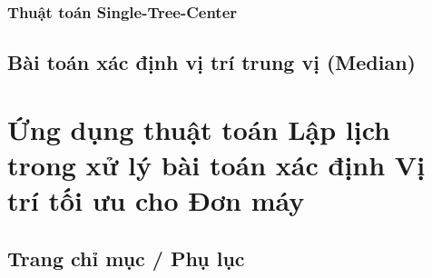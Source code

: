 \documentclass[12pt,a4paper]{report}
\begin{document}
\subsection{Thuật toán Single-Tree-Center}

\IncMargin{1em}
\begin{algorithm}

    \caption{Thuật toán Single-Tree-Center.}\label{algo_disjdecomp}
\end{algorithm}
\DecMargin{1em}


\section{Bài toán xác định vị trí trung vị (Median)}

\chapter{Ứng dụng thuật toán Lập lịch trong xử lý bài toán xác định Vị trí tối ưu cho Đơn máy}

\section*{Trang chỉ mục / Phụ lục}
\end{document}
